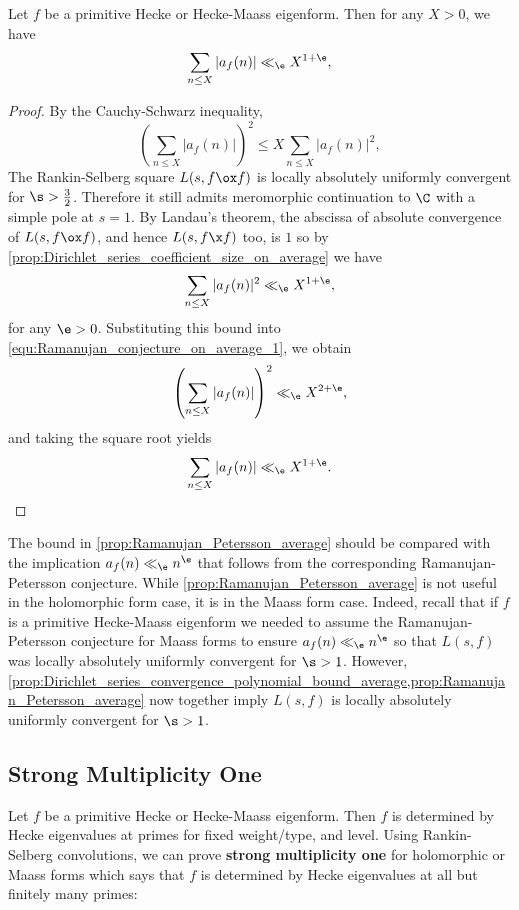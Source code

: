       \begin{proposition}\label{prop:Ramanujan_Petersson_average}
        Let $f$ be a primitive Hecke or Hecke-Maass eigenform. Then for any $X > 0$, we have
        \[
        \sum_{n \le X}|a_{f}(n)| \ll_{\e} X^{1+\e},
        \]
      \end{proposition}
      \begin{proof}
        By the Cauchy-Schwarz inequality,
        \begin{equation}\label{equ:Ramanujan_conjecture_on_average_1}
          \left(\sum_{n \le X}|a_{f}(n)|\right)^{2} \le X\sum_{n \le X}|a_{f}(n)|^{2},
        \end{equation}
        The Rankin-Selberg square $L(s,f \ox f)$ is locally absolutely uniformly convergent for $\s > \frac{3}{2}$. Therefore it still admits meromorphic continuation to $\C$ with a simple pole at $s = 1$. By Landau's theorem, the abscissa of absolute convergence of $L(s,f \ox f)$, and hence $L(s,f \x f)$ too, is $1$ so by \cref{prop:Dirichlet_series_coefficient_size_on_average} we have
        \[
          \sum_{n \le X}|a_{f}(n)|^{2} \ll_{\e} X^{1+\e},
        \]
        for any $\e > 0$. Substituting this bound into \cref{equ:Ramanujan_conjecture_on_average_1}, we obtain
        \[
          \left(\sum_{n \le X}|a_{f}(n)|\right)^{2} \ll_{\e} X^{2+\e},
        \]
        and taking the square root yields
        \[
          \sum_{n \le X}|a_{f}(n)| \ll_{\e} X^{1+\e}.
        \]
      \end{proof}
      
      The bound in \cref{prop:Ramanujan_Petersson_average} should be compared with the implication $a_{f}(n) \ll_{\e} n^{\e}$ that follows from the corresponding Ramanujan-Petersson conjecture. While \cref{prop:Ramanujan_Petersson_average} is not useful in the holomorphic form case, it is in the Maass form case. Indeed, recall that if $f$ is a primitive Hecke-Maass eigenform we needed to assume the Ramanujan-Petersson conjecture for Maass forms to ensure $a_{f}(n) \ll_{\e} n^{\e}$ so that $L(s,f)$ was locally absolutely uniformly convergent for $\s > 1$. However, \cref{prop:Dirichlet_series_convergence_polynomial_bound_average,prop:Ramanujan_Petersson_average} now together imply $L(s,f)$ is locally absolutely uniformly convergent for $\s > 1$.
    \subsection*{Strong Multiplicity One}
      Let $f$ be a primitive Hecke or Hecke-Maass eigenform. Then $f$ is determined by Hecke eigenvalues at primes for fixed weight/type, and level. Using Rankin-Selberg convolutions, we can prove \textbf{strong multiplicity one} for holomorphic or Maass forms which says that $f$ is determined by Hecke eigenvalues at all but finitely many primes:

